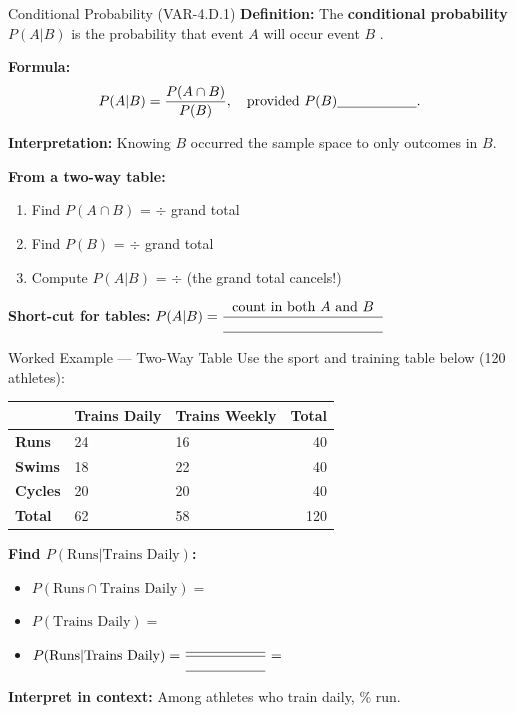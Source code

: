 \documentclass[10pt]{article}
\begin{document}
\begin{notesbox}{Conditional Probability (VAR-4.D.1)}
\small
\textbf{Definition:} The \textbf{conditional probability} $P(A|B)$ is the probability
that event $A$ will occur \blank{4cm} event $B$ \blank{3cm}.

\vspace{8pt}
\textbf{Formula:}
\[
  P(A|B) = \frac{P(A \cap B)}{P(B)}, \quad \text{provided } P(B) \blank{2cm}.
\]

\vspace{6pt}
\textbf{Interpretation:} Knowing $B$ occurred \blank{5cm} the sample space to only
outcomes in $B$.

\vspace{10pt}
\textbf{From a two-way table:}
\begin{enumerate}[leftmargin=1.5em, itemsep=4pt]
  \item Find $P(A \cap B)$ = \blank{5cm} $\div$ grand total
  \item Find $P(B)$ = \blank{5cm} $\div$ grand total
  \item Compute $P(A|B)$ = \blank{5cm} $\div$ \blank{3cm} (the grand total cancels!)
\end{enumerate}

\vspace{8pt}
\textbf{Short-cut for tables:} $P(A|B) = \dfrac{\text{count in both }A\text{ and }B}{\blank{4cm}}$
\end{notesbox}

\vspace{0.1in}

\begin{notesbox}{Worked Example --- Two-Way Table}
\small
Use the sport and training table below (120 athletes):
\vspace{4pt}
\renewcommand{\arraystretch}{1.4}
\begin{tabularx}{\linewidth}{@{} l X X r @{}}
 & \textbf{Trains Daily} & \textbf{Trains Weekly} & \textbf{Total} \\
\hline
\textbf{Runs}     & 24 & 16 & 40 \\
\textbf{Swims}    & 18 & 22 & 40 \\
\textbf{Cycles}   & 20 & 20 & 40 \\
\hline
\textbf{Total}    & 62 & 58 & 120 \\
\end{tabularx}

\vspace{8pt}
\textbf{Find $P(\text{Runs} | \text{Trains Daily})$:}
\begin{itemize}[itemsep=3pt]
  \item $P(\text{Runs} \cap \text{Trains Daily}) = $ \blank{3cm}
  \item $P(\text{Trains Daily}) = $ \blank{3cm}
  \item $P(\text{Runs} | \text{Trains Daily}) = \dfrac{\blank{2cm}}{\blank{2cm}} = $ \blank{3cm}
\end{itemize}

\vspace{6pt}
\textbf{Interpret in context:} Among athletes who train daily,
\blank{4cm}\% run.
\end{notesbox}
\end{document}

